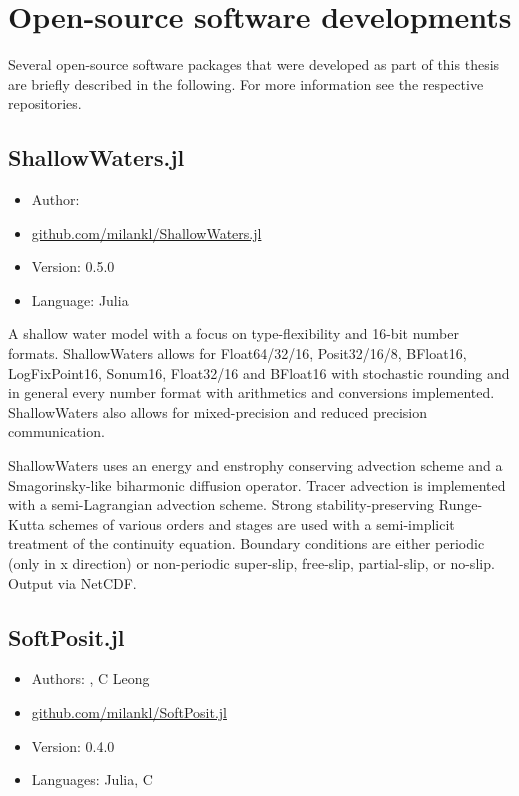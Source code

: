 \section{Open-source software developments}
\label{sec:open}

Several open-source software packages that were developed as part of this thesis are briefly described in the following. For more information
see the respective repositories.

\subsection{ShallowWaters.jl}

\begin{itemize}
    \setlength\itemsep{-5pt}
    \item Author: \cite{Klower2021}
    \item \href{https://github.com/milankl/ShallowWaters.jl}{github.com/milankl/ShallowWaters.jl}
    \item Version: 0.5.0
    \item Language: Julia
\end{itemize}

A shallow water model with a focus on type-flexibility and 16-bit number formats. ShallowWaters allows for Float64/32/16, Posit32/16/8, BFloat16,
LogFixPoint16, Sonum16, Float32/16 and BFloat16 with stochastic rounding and in general every number format with arithmetics and conversions
implemented. ShallowWaters also allows for mixed-precision and reduced precision communication.

ShallowWaters uses an energy and enstrophy conserving advection scheme and a Smagorinsky-like biharmonic diffusion operator. Tracer advection
is implemented with a semi-Lagrangian advection scheme. Strong stability-preserving Runge-Kutta schemes of various orders and stages are used
with a semi-implicit treatment of the continuity equation. Boundary conditions are either periodic (only in x direction) or non-periodic super-slip, free-slip,
partial-slip, or no-slip. Output via NetCDF.

\subsection{SoftPosit.jl}

\begin{itemize}
    \setlength\itemsep{-5pt}
    \item Authors: \cite{Klower2019}, C Leong
    \item \href{https://github.com/milankl/SoftPosit.jl}{github.com/milankl/SoftPosit.jl}
    \item Version: 0.4.0
    \item Languages: Julia, C
\end{itemize}

